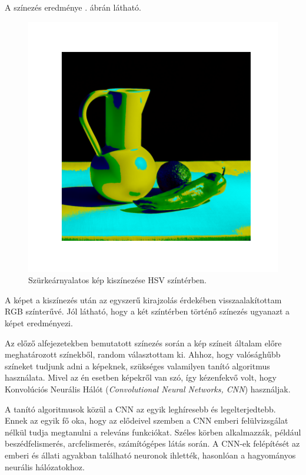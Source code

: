A színezés eredménye . ábrán látható.

\begin{figure}[h]
\centering
\includegraphics[scale=0.7]{images/colorized_hsv.png}
\caption{Szürkeárnyalatos kép kiszínezése HSV színtérben.}
\label{fig:colorized_hsv}
\end{figure}

A képet a kiszínezés után az egyszerű kirajzolás érdekében visszaalakítottam RGB színterűvé. Jól látható, hogy a két színtérben történő színezés ugyanazt a képet eredményezi.


Az előző alfejezetekben bemutatott színezés során a kép színeit általam előre meghatározott színekből, random választottam ki. Ahhoz, hogy valósághűbb színeket tudjunk adni a képeknek, szükséges valamilyen tanító algoritmus használata.  Mivel az én esetben képekről van szó, így kézenfekvő volt, hogy Konvolúciós Neurális Hálót (\textit{Convolutional Neural Networks, CNN}) használjak.

A tanító algoritmusok közül a CNN az egyik leghíresebb és legelterjedtebb. Ennek az egyik fő oka, hogy az elődeivel szemben a CNN emberi felülvizsgálat nélkül tudja megtanulni a releváns funkciókat. Széles körben alkalmazzák, például beszédfelismerés, arcfelismerés, számítógépes látás során. A CNN-ek felépítését az emberi és állati agyakban található neuronok ihlették, hasonlóan a hagyományos neurális hálózatokhoz.

